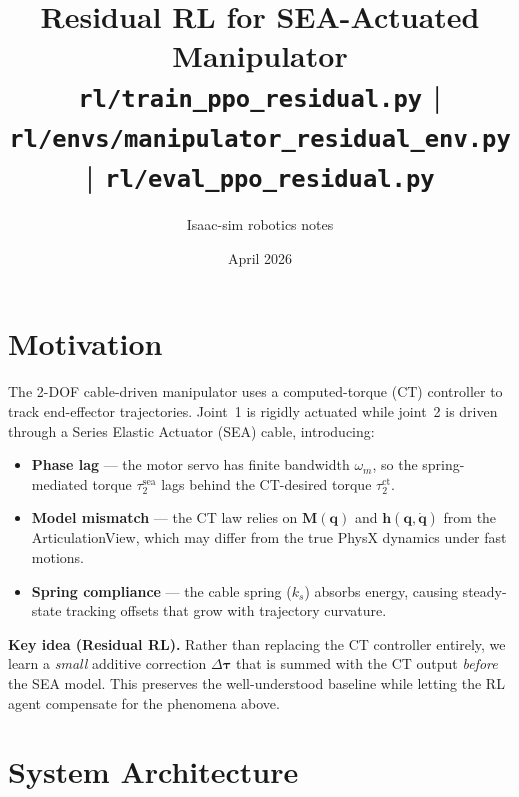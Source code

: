 \documentclass[11pt, a4paper]{article}
\title{\textbf{Residual RL for SEA-Actuated Manipulator}\\
       \large \texttt{rl/train\_ppo\_residual.py} \;|\;
              \texttt{rl/envs/manipulator\_residual\_env.py} \;|\;
              \texttt{rl/eval\_ppo\_residual.py}}
\date{April 2026}
\author{Isaac-sim robotics notes}
\newcommand{\bq}{\bm{q}}
\newcommand{\btau}{\bm{\tau}}
\newcommand{\bM}{\bm{M}}
\begin{document}
\maketitle
\tableofcontents
\newpage

\section{Motivation}

The 2-DOF cable-driven manipulator uses a computed-torque (CT) controller
to track end-effector trajectories.  Joint~1 is rigidly actuated while
joint~2 is driven through a Series Elastic Actuator (SEA) cable, introducing:

\begin{itemize}[nosep]
  \item \textbf{Phase lag} --- the motor servo has finite bandwidth $\omega_m$,
        so the spring-mediated torque $\tau_2^{\text{sea}}$ lags behind the
        CT-desired torque $\tau_2^{\text{ct}}$.
  \item \textbf{Model mismatch} --- the CT law relies on $\bM(\bq)$ and
        $\bm{h}(\bq,\dot{\bq})$ from the ArticulationView, which may
        differ from the true PhysX dynamics under fast motions.
  \item \textbf{Spring compliance} --- the cable spring ($k_s$) absorbs
        energy, causing steady-state tracking offsets that grow with
        trajectory curvature.
\end{itemize}

\begin{mdframed}
\textbf{Key idea (Residual RL).}\;
Rather than replacing the CT controller entirely, we learn a \emph{small}
additive correction $\Delta\btau$ that is summed with the CT output
\emph{before} the SEA model.  This preserves the well-understood baseline
while letting the RL agent compensate for the phenomena above.
\end{mdframed}


\section{System Architecture}
\end{document}
